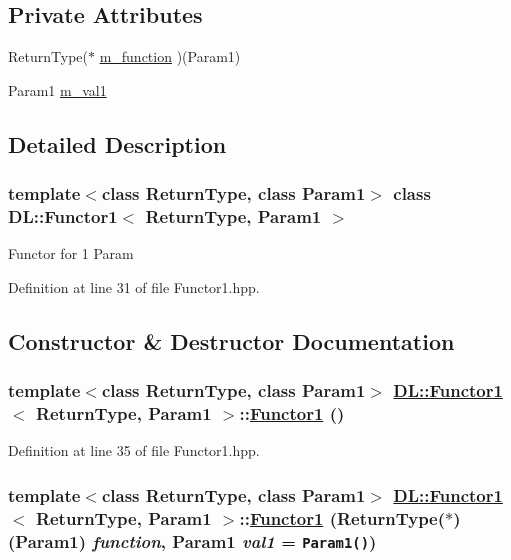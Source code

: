 \subsection*{Private Attributes}
\begin{CompactItemize}
\item 
Return\-Type($\ast$ \hyperlink{classDL_1_1Functor1_r0}{m\_\-function} )(Param1)
\item 
Param1 \hyperlink{classDL_1_1Functor1_r1}{m\_\-val1}
\end{CompactItemize}


\subsection{Detailed Description}
\subsubsection*{template$<$class Return\-Type, class Param1$>$ class DL::Functor1$<$ Return\-Type, Param1 $>$}

Functor for 1 Param



Definition at line 31 of file Functor1.hpp.

\subsection{Constructor \& Destructor Documentation}
\hypertarget{classDL_1_1Functor1_d0}{
\subsubsection[Functor1]{\setlength{\rightskip}{0pt plus 5cm}template$<$class Return\-Type, class Param1$>$ \hyperlink{classDL_1_1Functor1}{DL::Functor1}$<$ Return\-Type, Param1 $>$::\hyperlink{classDL_1_1Functor1}{Functor1} ()}}
\label{classDL_1_1Functor1_d0}




Definition at line 35 of file Functor1.hpp.\hypertarget{classDL_1_1Functor1_a0}{
\subsubsection[Functor1]{\setlength{\rightskip}{0pt plus 5cm}template$<$class Return\-Type, class Param1$>$ \hyperlink{classDL_1_1Functor1}{DL::Functor1}$<$ Return\-Type, Param1 $>$::\hyperlink{classDL_1_1Functor1}{Functor1} (Return\-Type($\ast$)(Param1) {\em function}, Param1 {\em val1} = {\tt Param1()})}}
\label{classDL_1_1Functor1_a0}




